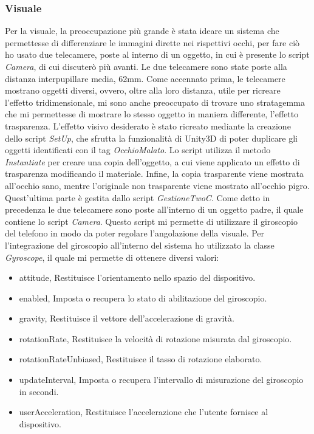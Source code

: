 \documentclass[
a4paper,
cleardoublepage=empty,
headings=twolinechapter,
numbers=autoenddot,
]{scrbook}
\begin{document}
     \subsubsection{Visuale}
     Per la visuale, la preoccupazione più grande è stata ideare un sistema che permettesse di differenziare le immagini dirette nei rispettivi occhi, per fare ciò ho usato due telecamere, poste al interno di un oggetto, in cui è presente lo script \textit{Camera}, di cui discuterò più avanti.
     Le due telecamere sono state poste alla distanza interpupillare media, 62mm\cite{Distanza_occhi}.
     Come accennato prima, le telecamere mostrano oggetti diversi, ovvero, oltre alla loro distanza, utile per ricreare l'effetto tridimensionale, mi sono anche preoccupato di trovare uno stratagemma che mi permettesse di mostrare lo stesso oggetto in maniera differente, l'effetto trasparenza.
     L'effetto visivo desiderato è stato ricreato mediante la creazione dello script \textit{SetUp}, che sfrutta la funzionalità di Unity3D di poter duplicare gli oggetti identificati con il tag \textit{OcchioMalato}. Lo script utilizza il metodo \textit{Instantiate} per creare una copia dell'oggetto, a cui viene applicato un effetto di trasparenza modificando il materiale. Infine, la copia trasparente viene mostrata all'occhio sano, mentre l'originale non trasparente viene mostrato all'occhio pigro. Quest'ultima parte è gestita dallo script \textit{GestioneTwoC}.
     Come detto in precedenza le due telecamere sono poste all'interno di un oggetto padre, il quale contiene lo script \textit{Camera}.
     Questo script mi permette di utilizzare il giroscopio del telefono in modo da poter regolare l'angolazione della visuale.
     Per l'integrazione del giroscopio all'interno del sistema ho utilizzato la classe \textit{Gyroscope}, il quale mi permette di ottenere diversi valori:
     \begin{itemize}
        \item attitude,	Restituisce l'orientamento nello spazio del dispositivo.
        \item enabled, Imposta o recupera lo stato di abilitazione del giroscopio.
        \item gravity, Restituisce il vettore dell'accelerazione di gravità.
        \item rotationRate,	Restituisce la velocità di rotazione misurata dal giroscopio.
        \item rotationRateUnbiased,	Restituisce il tasso di rotazione elaborato.
        \item updateInterval, Imposta o recupera l'intervallo di misurazione del giroscopio in secondi.
        \item userAcceleration,	Restituisce l'accelerazione che l'utente fornisce al dispositivo.
     \end{itemize}
\end{document}
